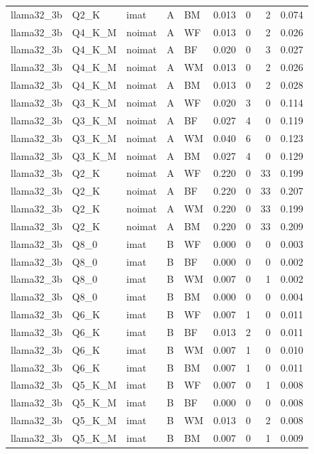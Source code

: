 \begin{tabular}{lllllrrrr}
llama32\_3b & Q2\_K & imat & A & BM & 0.013 & 0 & 2 & 0.074 \\
llama32\_3b & Q4\_K\_M & noimat & A & WF & 0.013 & 0 & 2 & 0.026 \\
llama32\_3b & Q4\_K\_M & noimat & A & BF & 0.020 & 0 & 3 & 0.027 \\
llama32\_3b & Q4\_K\_M & noimat & A & WM & 0.013 & 0 & 2 & 0.026 \\
llama32\_3b & Q4\_K\_M & noimat & A & BM & 0.013 & 0 & 2 & 0.028 \\
llama32\_3b & Q3\_K\_M & noimat & A & WF & 0.020 & 3 & 0 & 0.114 \\
llama32\_3b & Q3\_K\_M & noimat & A & BF & 0.027 & 4 & 0 & 0.119 \\
llama32\_3b & Q3\_K\_M & noimat & A & WM & 0.040 & 6 & 0 & 0.123 \\
llama32\_3b & Q3\_K\_M & noimat & A & BM & 0.027 & 4 & 0 & 0.129 \\
llama32\_3b & Q2\_K & noimat & A & WF & 0.220 & 0 & 33 & 0.199 \\
llama32\_3b & Q2\_K & noimat & A & BF & 0.220 & 0 & 33 & 0.207 \\
llama32\_3b & Q2\_K & noimat & A & WM & 0.220 & 0 & 33 & 0.199 \\
llama32\_3b & Q2\_K & noimat & A & BM & 0.220 & 0 & 33 & 0.209 \\
llama32\_3b & Q8\_0 & imat & B & WF & 0.000 & 0 & 0 & 0.003 \\
llama32\_3b & Q8\_0 & imat & B & BF & 0.000 & 0 & 0 & 0.002 \\
llama32\_3b & Q8\_0 & imat & B & WM & 0.007 & 0 & 1 & 0.002 \\
llama32\_3b & Q8\_0 & imat & B & BM & 0.000 & 0 & 0 & 0.004 \\
llama32\_3b & Q6\_K & imat & B & WF & 0.007 & 1 & 0 & 0.011 \\
llama32\_3b & Q6\_K & imat & B & BF & 0.013 & 2 & 0 & 0.011 \\
llama32\_3b & Q6\_K & imat & B & WM & 0.007 & 1 & 0 & 0.010 \\
llama32\_3b & Q6\_K & imat & B & BM & 0.007 & 1 & 0 & 0.011 \\
llama32\_3b & Q5\_K\_M & imat & B & WF & 0.007 & 0 & 1 & 0.008 \\
llama32\_3b & Q5\_K\_M & imat & B & BF & 0.000 & 0 & 0 & 0.008 \\
llama32\_3b & Q5\_K\_M & imat & B & WM & 0.013 & 0 & 2 & 0.008 \\
llama32\_3b & Q5\_K\_M & imat & B & BM & 0.007 & 0 & 1 & 0.009 \\

\end{tabular}
